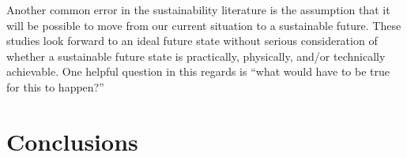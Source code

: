 \documentclass[12pt]{article}
\begin{document}
Another common error in the sustainability literature is the assumption that it will be possible to move 
from our current situation to a sustainable future. These studies look forward to an ideal future state without
serious consideration of whether a sustainable future state is practically, physically, and/or technically achievable. 
One helpful question in this regards is ``what would have to be true for this to happen?''


\section{Conclusions}
\label{sec:conclusions}



\printbibliography
\end{document}
